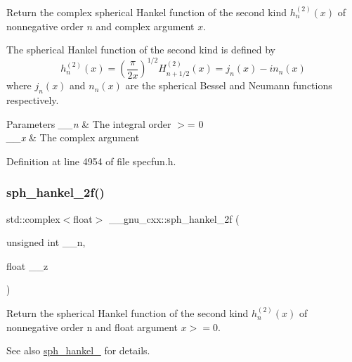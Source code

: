 Return the complex spherical Hankel function of the second kind $ h^{(2)}_n(x) $ of nonnegative order $ n $ and complex argument $ x $.

The spherical Hankel function of the second kind is defined by \[ h^{(2)}_n(x) = \left(\frac{\pi}{2x} \right) ^{1/2} H^{(2)}_{n+1/2}(x) = j_n(x) - i n_n(x) \] where $ j_n(x) $ and $ n_n(x) $ are the spherical Bessel and Neumann functions respectively.


\begin{DoxyParams}{Parameters}
{\em \+\_\+\+\_\+n} & The integral order $>$= 0 \\
\hline
{\em \+\_\+\+\_\+x} & The complex argument \\
\hline
\end{DoxyParams}


Definition at line 4954 of file specfun.\+h.

\mbox{\label{group__gnu__math__spec__func_ga9496b81f94b8ba0162cf45df72be1e71}} 
\subsubsection{\texorpdfstring{sph\+\_\+hankel\+\_\+2f()}{sph\_hankel\_2f()}\hspace{0.1cm}{\footnotesize\ttfamily [1/2]}}
{\footnotesize\ttfamily std\+::complex$<$float$>$ \+\_\+\+\_\+gnu\+\_\+cxx\+::sph\+\_\+hankel\+\_\+2f (\begin{DoxyParamCaption}\item[{unsigned int}]{\+\_\+\+\_\+n,  }\item[{float}]{\+\_\+\+\_\+z }\end{DoxyParamCaption})\hspace{0.3cm}{\ttfamily [inline]}}

Return the spherical Hankel function of the second kind $ h^{(2)}_n(x)$ of nonnegative order n and {\ttfamily float} argument $ x >= 0 $.

\begin{DoxySeeAlso}{See also}
\hyperlink{group__gnu__math__spec__func_ga1ca08866a25e3637b04c57ff5a0c36a5}{sph\+\_\+hankel\+\_} for details. 
\end{DoxySeeAlso}


